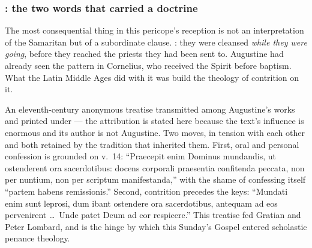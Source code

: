 \subsubsection*{: the two words that carried a doctrine}

The most consequential thing in this pericope's reception is not an
interpretation of the Samaritan but of a subordinate clause. : they were cleansed \textit{while they were
going}, before they reached the priests they had been sent to. Augustine had
already seen the pattern in Cornelius, who received the Spirit before baptism.
What the Latin Middle Ages did with it was build the theology of contrition on
it.

\begin{witnessnote}
An eleventh-century anonymous treatise transmitted among Augustine's works and
printed under  --- the attribution is stated here
because the text's influence is enormous and its author is not Augustine. Two
moves, in tension with each other and both retained by the tradition that
inherited them. First, oral and personal confession is grounded on v.~14:
``Praecepit enim Dominus mundandis, ut ostenderent ora sacerdotibus: docens
corporali praesentia confitenda peccata, non per nuntium, non per scriptum
manifestanda,'' with the shame of confessing itself ``partem habens
remissionis.'' Second, contrition precedes the keys: ``Mundati enim sunt
leprosi, dum ibant ostendere ora sacerdotibus, antequam ad eos pervenirent
\dots\ Unde patet Deum ad cor respicere.'' This treatise fed Gratian and Peter
Lombard, and is the hinge by which this Sunday's Gospel entered scholastic
penance theology.
\end{witnessnote}

